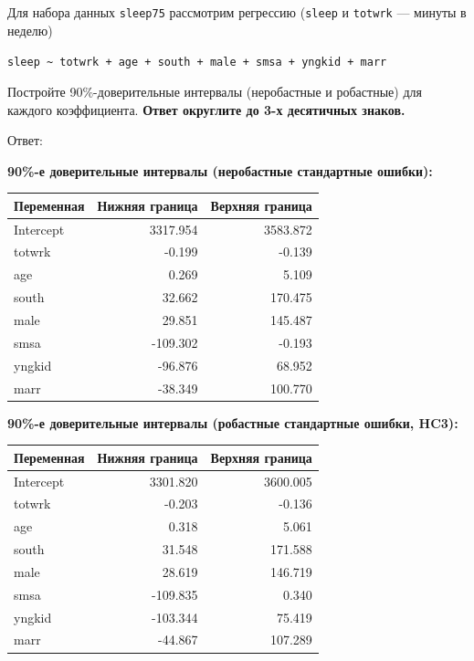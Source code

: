 \documentclass[
  russian,
]{article}
\newcounter{none} %
\begin{document}
Для набора данных \texttt{sleep75} рассмотрим регрессию (\texttt{sleep}
и \texttt{totwrk} --- минуты в неделю)

\texttt{sleep\ \textasciitilde{}\ totwrk\ +\ age\ +\ south\ +\ male\ +\ smsa\ +\ yngkid\ +\ marr}

Постройте 90\%-доверительные интервалы (неробастные и робастные) для
каждого коэффициента. \textbf{Ответ округлите до 3-х десятичных знаков.}

Ответ:

\textbf{90\%-е доверительные интервалы (неробастные стандартные
ошибки):}

{\def\LTcaptype{none} %
\begin{longtable}[]{@{}lrr@{}}
\toprule\noalign{}
Переменная & Нижняя граница & Верхняя граница \\
\midrule\noalign{}
\endhead
\bottomrule\noalign{}
\endlastfoot
Intercept & 3317.954 & 3583.872 \\
totwrk & -0.199 & -0.139 \\
age & 0.269 & 5.109 \\
south & 32.662 & 170.475 \\
male & 29.851 & 145.487 \\
smsa & -109.302 & -0.193 \\
yngkid & -96.876 & 68.952 \\
marr & -38.349 & 100.770 \\
\end{longtable}
}

\textbf{90\%-е доверительные интервалы (робастные стандартные ошибки,
HC3):}

{\def\LTcaptype{none} %
\begin{longtable}[]{@{}lrr@{}}
\toprule\noalign{}
Переменная & Нижняя граница & Верхняя граница \\
\midrule\noalign{}
\endhead
\bottomrule\noalign{}
\endlastfoot
Intercept & 3301.820 & 3600.005 \\
totwrk & -0.203 & -0.136 \\
age & 0.318 & 5.061 \\
south & 31.548 & 171.588 \\
male & 28.619 & 146.719 \\
smsa & -109.835 & 0.340 \\
yngkid & -103.344 & 75.419 \\
marr & -44.867 & 107.289 \\
\end{longtable}
}
\end{document}
